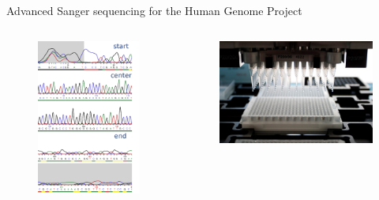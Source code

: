\documentclass[10pt]{beamer}
\begin{document}
\begin{frame}{Advanced Sanger sequencing for the Human Genome Project}
	\begin{columns}[T,onlytextwidth]
		\begin{figure}
			\includegraphics[width=\textwidth]{./figures/chromatogramm-eng.png}
		\end{figure}
		\begin{figure}
			\includegraphics[width=\textwidth]{./figures/baseclearseq.jpg}

\end{figure}
\end{columns}
\end{frame}
\end{document}
